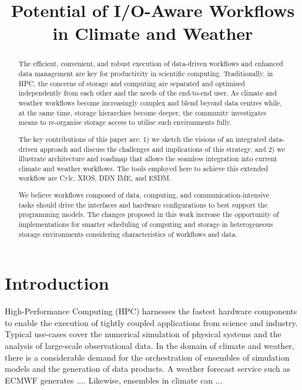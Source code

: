 \documentclass{superfri}
\newcommand{\jk}[1]{\todo[inline]{JK: #1}}
\begin{document}
\author{}

\title{Potential of I/O-Aware Workflows in Climate and Weather}

\maketitle{}

\begin{abstract}%
The efficient, convenient, and robust execution of data-driven workflows and enhanced data management are key for productivity in scientific computing.
Traditionally, in HPC, the concerns of storage and computing are separated and optimised independently from each other and the needs of the end-to-end user.
As climate and weather workflows become increasingly complex and blend beyond data centres while, at the same time, storage hierarchies become deeper, the community investigates means to re-organise storage access to utilise such environments fully.

The key contributions of this paper are:
1) we sketch the visions of an integrated data-driven approach and discuss the challenges and implications of this strategy, and 2) we illustrate architecture and roadmap that allows the seamless integration into current climate and weather workflows.
The tools employed here to achieve this extended workflow are Cylc, XIOS, DDN IME, and ESDM.

We believe workflows composed of data, computing, and communication-intensive tasks should drive the interfaces and hardware configurations to best support the programming models.
The changes proposed in this work increase the opportunity of implementations for smarter scheduling of computing and storage in heterogeneous storage environments considering characteristics of workflows and data.

\end{abstract}

\section*{Introduction}
\label{sec:intro}

High-Performance Computing (HPC) harnesses the fastest hardware components to enable the execution of tightly coupled applications from science and industry.
Typical use-cases cover the numerical simulation of physical systems and the analysis of large-scale observational data.
In the domain of climate and weather, there is a considerable demand for the orchestration of ensembles of simulation models and the generation of data products.
A weather forecast service such as ECMWF generates .... \jk{Cylc team, please provide some facts}
Likewise, ensembles in climate can ...
\end{document}
